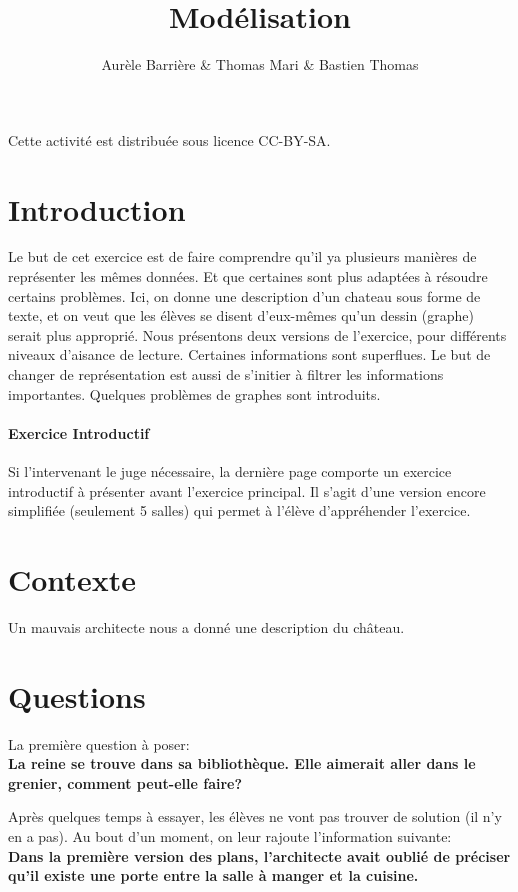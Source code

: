 \documentclass{article}
\title{Modélisation}
\author{Aurèle Barrière \& Thomas Mari \& Bastien Thomas}
\date{}
\begin{document}
\maketitle

Cette activité est distribuée sous licence CC-BY-SA.

\section{Introduction}
Le but de cet exercice est de faire comprendre qu'il ya plusieurs manières de représenter les mêmes données.
Et que certaines sont plus adaptées à résoudre certains problèmes.
Ici, on donne une description d'un chateau sous forme de texte, et on veut que les élèves se disent d'eux-mêmes qu'un dessin (graphe) serait plus approprié.
Nous présentons deux versions de l'exercice, pour différents niveaux d'aisance de lecture.
Certaines informations sont superflues. Le but de changer de représentation est aussi de s'initier à filtrer les informations importantes.
Quelques problèmes de graphes sont introduits.

\paragraph{Exercice Introductif}
Si l'intervenant le juge nécessaire, la dernière page comporte un exercice introductif à présenter avant l'exercice principal.
Il s'agit d'une version encore simplifiée (seulement 5 salles) qui permet à l'élève d'appréhender l'exercice.

\section{Contexte}
Un mauvais architecte nous a donné une description du château.

\section{Questions}
La première question à poser:\\
\textbf{La reine se trouve dans sa bibliothèque. Elle aimerait aller dans le grenier, comment peut-elle faire?}

Après quelques temps à essayer, les élèves ne vont pas trouver de solution (il n'y en a pas).
Au bout d'un moment, on leur rajoute l'information suivante:\\
\textbf{Dans la première version des plans, l'architecte avait oublié de préciser qu'il existe une porte entre la salle à manger et la cuisine.}
\end{document}
